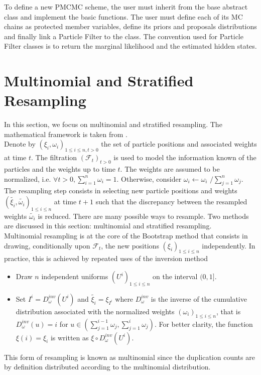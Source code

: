 \documentclass[11pt,a4,twosided,singlespacing,titlepagenumber=on]{scrreprt}
\numberwithin{equation}{chapter} %
\theoremstyle{remark}
\begin{document}
To define a new PMCMC scheme, the user must inherit from the base abstract class and implement the basic functions. The user must define each of its MC chains as protected member variables, define its priors and proposals distributions and finally link a Particle Filter to the class. The convention used for Particle Filter classes is to return the marginal likelihood and the estimated hidden states.

\section{Multinomial and Stratified Resampling}
\label{app:proof}

In this section, we focus on multinomial and stratified resampling. The mathematical framework is taken from \cite{douc2005}. \\

Denote by $\left( \xi_i, \omega_i \right)_{1 \leq i \leq n, t > 0}$ the set of particle positions and associated weights at time $t$. The filtration $(\mathcal{F}_t)_{t > 0}$ is used to model the information known of the particles and the weights up to time $t$. The weights are assumed to be normalized, i.e. $\forall t > 0, \sum_{i=1}^n \omega_i = 1$. Otherwise, consider $\omega_i \leftarrow \omega_i \text{ /} \sum_{j=1}^n \omega_j$. The resampling step consists in selecting new particle positions and weights $\left( \widetilde{\xi_i}, \widetilde{\omega_i} \right)_{1 \leq i \leq n}$ at time $t+1$ such that the discrepancy between the resampled weights $\widetilde{\omega_i}$ is reduced. There are many possible ways to resample. Two methods are discussed in this section: multinomial and stratified resampling. \\


Multinomial resampling is at the core of the Bootstrap method that consists in drawing, conditionally upon $\mathcal{F}_t$, the new positions $\left( \xi_i \right)_{1 \leq i \leq n}$ independently. In practice, this is achieved by repeated uses of the inversion method
\begin{itemize}
\item Draw $n$ independent uniforms $(U^i)_{1 \leq i \leq n}$ on the interval $(0, 1]$.
\item Set $I^i = D_\omega^{inv}(U^i)$ and $\widetilde{\xi_i} = \xi_{I^i}$ where $D_\omega^{inv}$ is the inverse of the cumulative distribution associated with the normalized weights $\left( \omega_i \right)_{1 \leq i \leq n}$, that is $D_\omega^{inv}(u) = i$ for $u \in \left( \sum_{j=1}^{i-1} \omega_j, \sum_{j=1}^i \omega_j \right)$. For better clarity, the function $\xi(i) = \xi_i$ is written as $\xi \circ D_\omega^{inv}(U^i)$.
\end{itemize}
This form of resampling is known as multinomial since the duplication counts are by definition distributed according to the multinomial distribution. \\
\end{document}
